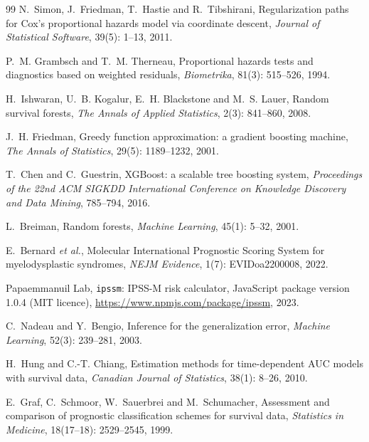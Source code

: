 \documentclass[11pt,a4paper]{article}
\begin{document}
\begin{thebibliography}{99}
N.~Simon, J.~Friedman, T.~Hastie and R.~Tibshirani,
Regularization paths for Cox's proportional hazards model via coordinate descent,
\textit{Journal of Statistical Software}, 39(5): 1--13, 2011.

P.~M. Grambsch and T.~M. Therneau,
Proportional hazards tests and diagnostics based on weighted residuals,
\textit{Biometrika}, 81(3): 515--526, 1994.

H.~Ishwaran, U.~B. Kogalur, E.~H. Blackstone and M.~S. Lauer,
Random survival forests,
\textit{The Annals of Applied Statistics}, 2(3): 841--860, 2008.

J.~H. Friedman,
Greedy function approximation: a gradient boosting machine,
\textit{The Annals of Statistics}, 29(5): 1189--1232, 2001.

T.~Chen and C.~Guestrin,
XGBoost: a scalable tree boosting system,
\textit{Proceedings of the 22nd ACM SIGKDD International Conference on Knowledge Discovery
and Data Mining}, 785--794, 2016.

L.~Breiman,
Random forests,
\textit{Machine Learning}, 45(1): 5--32, 2001.

E.~Bernard \textit{et al.},
Molecular International Prognostic Scoring System for myelodysplastic syndromes,
\textit{NEJM Evidence}, 1(7): EVIDoa2200008, 2022.

Papaemmanuil Lab,
\texttt{ipssm}: IPSS-M risk calculator, JavaScript package version 1.0.4 (MIT licence),
\url{https://www.npmjs.com/package/ipssm}, 2023.

C.~Nadeau and Y.~Bengio,
Inference for the generalization error,
\textit{Machine Learning}, 52(3): 239--281, 2003.

H.~Hung and C.-T. Chiang,
Estimation methods for time-dependent AUC models with survival data,
\textit{Canadian Journal of Statistics}, 38(1): 8--26, 2010.

E.~Graf, C.~Schmoor, W.~Sauerbrei and M.~Schumacher,
Assessment and comparison of prognostic classification schemes for survival data,
\textit{Statistics in Medicine}, 18(17--18): 2529--2545, 1999.

\end{thebibliography}
\end{document}
